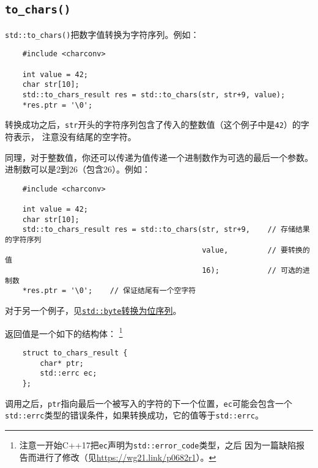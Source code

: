 \subsection{\texttt{to\_chars()}}\label{ch31.2.2}
\texttt{std::to\_chars()}把数字值转换为字符序列。例如：
\begin{lstlisting}
    #include <charconv>

    int value = 42;
    char str[10];
    std::to_chars_result res = std::to_chars(str, str+9, value);
    *res.ptr = '\0';
\end{lstlisting}
转换成功之后，\texttt{str}开头的字符序列包含了传入的整数值（这个例子中是\texttt{42}）的字符表示，
注意没有结尾的空字符。

同理，对于整数值，你还可以传递为值传递一个进制数作为可选的最后一个参数。
进制数可以是2到26（包含26）。例如：
\begin{lstlisting}
    #include <charconv>

    int value = 42;
    char str[10];
    std::to_chars_result res = std::to_chars(str, str+9,    // 存储结果的字符序列
                                             value,         // 要转换的值
                                             16);           // 可选的进制数
    *res.ptr = '\0';    // 保证结尾有一个空字符
\end{lstlisting}
对于另一个例子，见\hyperref[byte到位序列]{\texttt{std::byte}转换为位序列}。

返回值是一个如下的结构体：
\footnote{注意一开始C++17把\texttt{ec}声明为\texttt{std::error\_code}类型，之后
因为一篇缺陷报告而进行了修改（见\url{https://wg21.link/p0682r1}）。}
\begin{lstlisting}
    struct to_chars_result {
        char* ptr;
        std::errc ec;
    };
\end{lstlisting}
调用之后，\texttt{ptr}指向最后一个被写入的字符的下一个位置，\texttt{ec}可能会包含一个
\texttt{std::errc}类型的错误条件，如果转换成功，它的值等于\texttt{std::errc{}}。


